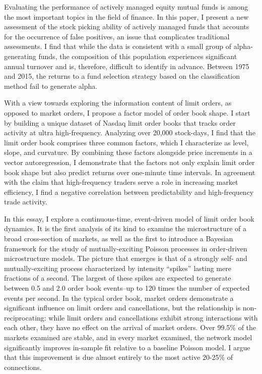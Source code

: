 

Evaluating the performance of actively managed equity mutual funds is among the most important topics in the field of finance. In this paper, I present a new assessment of the stock picking ability of actively managed funds that accounts for the occurrence of false positives, an issue that complicates traditional assessments. I find that while the data is consistent with a small group of alpha-generating funds, the composition of this population experiences significant annual turnover and is, therefore, difficult to identify in advance. Between 1975 and 2015, the returns to a fund selection strategy based on the classification method fail to generate alpha.

With a view towards exploring the information content of limit orders, as opposed to market orders, I propose a factor model of order book shape. I start by building a unique dataset of Nasdaq limit order books that tracks order activity at ultra high-frequency. Analyzing over 20,000 stock-days, I find that the limit order book comprises three common factors, which I characterize as level, slope, and curvature. By combining these factors alongside price increments in a vector autoregression, I demonstrate that the factors not only explain limit order book shape but also predict returns over one-minute time intervals. In agreement with the claim that high-frequency traders serve a role in increasing market efficiency, I find a negative correlation between predictability and high-frequency trade activity.

In this essay, I explore a continuous-time, event-driven model of limit order book dynamics. It is the first analysis of its kind to examine the microstructure of a broad cross-section of markets, as well as the first to introduce a Bayesian framework for the study of mutually-exciting Poisson processes in order-driven microstructure models. The picture that emerges is that of a strongly self- and mutually-exciting process characterized by intensity ``spikes'' lasting mere fractions of a second. The largest of these spikes are expected to generate between 0.5 and 2.0 order book events--up to 120 times the number of expected events per second. In the typical order book, market orders demonstrate a significant influence on limit orders and cancellations, but the relationship is non-reciprocating: while limit orders and cancellations exhibit strong interactions with each other, they have no effect on the arrival of market orders. Over 99.5\% of the markets examined are stable, and in every market examined, the network model significantly improves in-sample fit relative to a baseline Poisson model. I argue that this improvement is due almost entirely to the most active 20-25\% of connections.
